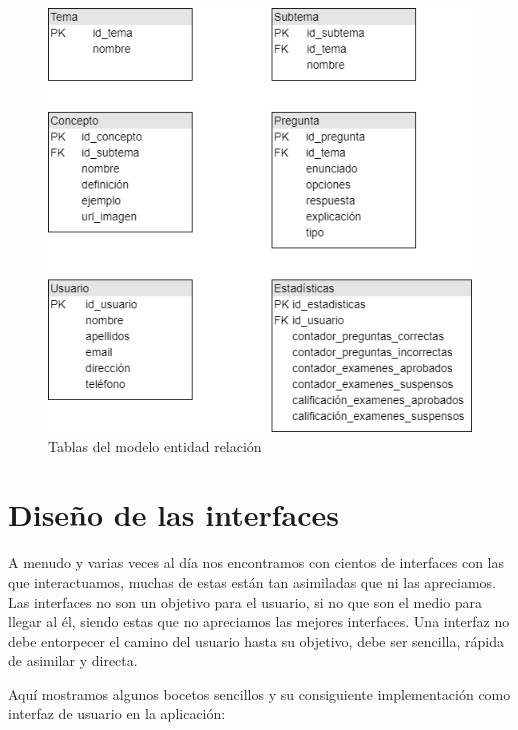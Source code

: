 \begin{figure}[!ht]
  \begin{center}
    \includegraphics[width=1\textwidth]{../images/entidad_relacion_simplificado.png}
    \caption{Tablas del modelo entidad relación}
    \label{fig:entidad_relacion_simplificado}
  \end{center}
\end{figure}


\newpage

\section{Diseño de las interfaces}

A menudo y varias veces al día nos encontramos con cientos de interfaces\cite{user_exp2} con las que interactuamos, muchas de estas están tan asimiladas que ni las apreciamos. Las interfaces no son un objetivo para el usuario, si no que son el medio para llegar al él, siendo estas que no apreciamos las mejores interfaces. Una interfaz\cite{user_exp} no debe entorpecer el camino del usuario hasta su objetivo, debe ser sencilla, rápida de asimilar y directa.

\bigskip
Aquí mostramos algunos bocetos sencillos y su consiguiente implementación como interfaz de usuario en la aplicación:

